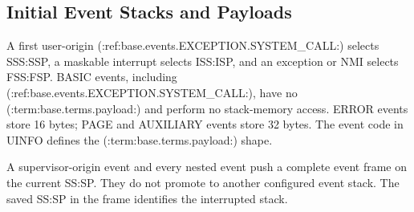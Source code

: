 \subsection{Initial Event Stacks and Payloads}
A first user-origin (:ref:base.events.EXCEPTION.SYSTEM_CALL:) selects SSS:SSP, a maskable interrupt selects ISS:ISP, and an exception or NMI selects FSS:FSP. BASIC events, including (:ref:base.events.EXCEPTION.SYSTEM_CALL:), have no (:term:base.terms.payload:) and perform no stack-memory access. ERROR events store 16 bytes; PAGE and AUXILIARY events store 32 bytes. The event code in UINFO defines the (:term:base.terms.payload:) shape.

A supervisor-origin event and every nested event push a complete event frame on the current SS:SP. They do not promote to another configured event stack. The saved SS:SP in the frame identifies the interrupted stack.
